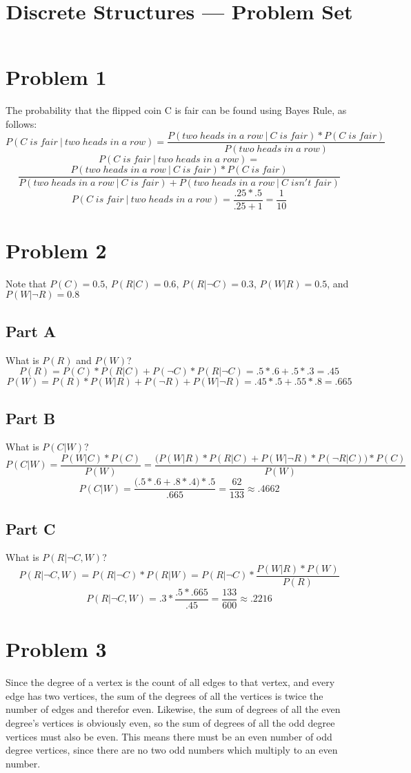 \documentclass[11pt]{article}
\title{Discrete Structures --- Problem Set \Homework}
\author{\Name}
\date{}
\begin{document}
\maketitle

\section*{Problem 1}
The probability that the flipped coin C is fair can be found using Bayes Rule, as follows:
\[ P(C\;is\;fair\:|\:two\;heads\;in\;a\;row) = \frac{P(two\;heads\;in\;a\;row\:|\:C\;is\;fair) * P(C\;is\;fair)}{P(two\;heads\;in\;a\;row)} \]
\[ P(C\;is\;fair\:|\:two\;heads\;in\;a\;row) = \]
\[\frac{P(two\;heads\;in\;a\;row\:|\:C\;is\;fair) * P(C\;is\;fair)}{P(two\;heads\;in\;a\;row\:|\:C\;is\;fair) + P(two\;heads\;in\;a\;row\:|\:C\;isn't\;fair)}\]
\[ P(C\;is\;fair\:|\:two\;heads\;in\;a\;row) = \frac{.25 * .5}{.25 + 1} = \frac{1}{10}\]

\section*{Problem 2}
Note that $P(C)=0.5$, $P(R|C)=0.6$, $P(R|\neg C)=0.3$, $P(W|R)=0.5$, and $P(W|\neg R)=0.8$

\subsection*{Part A}
What is $P(R)$ and $P(W)$?
\[P(R) = P(C) * P(R|C) + P(\neg C) * P(R|\neg C) = .5 * .6 + .5 * .3 = .45 \]
\[P(W) = P(R) * P(W|R) + P(\neg R) + P(W|\neg R) = .45 * .5 + .55 * .8 = .665 \]

\subsection*{Part B}
What is $P(C|W)$?
\[P(C|W) = \frac{P(W|C) * P(C)}{P(W)} =  \frac{\Big(P(W|R) * P(R|C) + P(W|\neg R) * P(\neg R|C)\Big) * P(C)}{P(W)} \]
\[P(C|W) = \frac{\Big( .5 * .6 + .8 * .4\Big) * .5}{.665} = \frac{62}{133} \approx .4662 \]

\subsection*{Part C}
What is $P(R|\neg C, W)$?
\[P(R|\neg C, W) = P(R|\neg C) * P(R|W) = P(R|\neg C) * \frac{P(W|R) * P(W)}{P(R)}\]
\[P(R|\neg C, W) = .3 * \frac{.5 * .665}{.45} = \frac{133}{600} \approx .2216 \]

\section*{Problem 3}
Since the degree of a vertex is the count of all edges to that vertex, and every edge has two vertices, the sum of the degrees of all the vertices is twice the number of edges and therefor even. Likewise, the sum of degrees of all the even degree's vertices is obviously even, so the sum of degrees of all the odd degree vertices must also be even. This means there must be an even number of odd degree vertices, since there are no two odd numbers which multiply to an even number.
\end{document}
